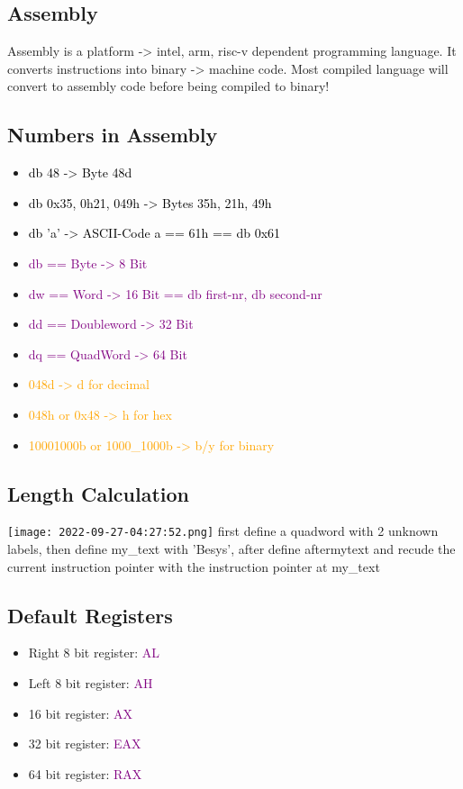 \documentclass[main.tex,fontsize=8pt,paper=a4,paper=landscape,DIV=calc,]{scrartcl}
\begin{document}
\begin{multicols*}{4}


\section{Assembly}
Assembly is a platform -> intel, arm, risc-v dependent programming language. 
It converts instructions into binary -> machine code. Most compiled language will convert to assembly code before being compiled to binary!

\subsection{Numbers in Assembly}
\begin{itemize}
\item \textcolor{black}{db 48 -> Byte 48d}
\item \textcolor{black}{db 0x35, 0h21, 049h -> Bytes 35h, 21h, 49h}
\item \textcolor{black}{db 'a' -> ASCII-Code a == 61h == db 0x61}
\item \textcolor{purple}{db == Byte -> 8 Bit}
\item \textcolor{purple}{dw == Word -> 16 Bit == db first-nr, db second-nr}
\item \textcolor{purple}{dd == Doubleword -> 32 Bit}
\item \textcolor{purple}{dq == QuadWord -> 64 Bit}
\item \textcolor{orange}{048d -> d for decimal}
\item \textcolor{orange}{048h or 0x48 -> h for hex}
\item \textcolor{orange}{10001000b or 1000\_1000b -> b/y for binary}
\end{itemize}
\subsection{Length Calculation}
\texttt{[image: 2022-09-27-04:27:52.png]}
first define a quadword with 2 unknown labels, then define my\_text with 'Besys',
after define aftermytext and recude the current instruction pointer with the instruction pointer at my\_text
\subsection{Default Registers}
\begin{itemize}
\item Right 8 bit register: \textcolor{purple}{AL}
\item Left 8 bit register: \textcolor{purple}{AH}
\item 16 bit register: \textcolor{purple}{AX}
\item 32 bit register: \textcolor{purple}{EAX}
\item 64 bit register: \textcolor{purple}{RAX}
\end{itemize} 


\end{multicols*}
\end{document}
